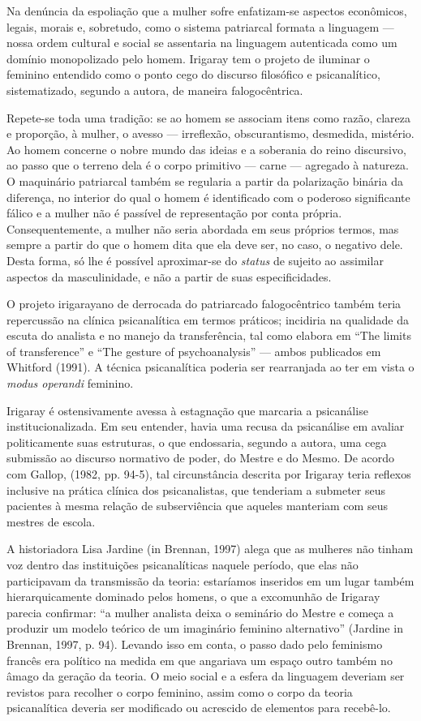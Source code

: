 Na denúncia da espoliação que a mulher sofre enfatizam-se aspectos
econômicos, legais, morais e, sobretudo, como o sistema patriarcal
formata a linguagem --- nossa ordem cultural e social se assentaria na
linguagem autenticada como um domínio monopolizado pelo homem. Irigaray
tem o projeto de iluminar o feminino entendido como o ponto cego do
discurso filosófico e psicanalítico, sistematizado, segundo a autora, de
maneira falogocêntrica.

Repete-se toda uma tradição: se ao homem se associam itens como razão,
clareza e proporção, à mulher, o avesso --- irreflexão, obscurantismo,
desmedida, mistério. Ao homem concerne o nobre mundo das ideias e a
soberania do reino discursivo, ao passo que o terreno dela é o corpo
primitivo --- carne --- agregado à natureza. O maquinário patriarcal
também se regularia a partir da polarização binária da diferença, no
interior do qual o homem é identificado com o poderoso significante
fálico e a mulher não é passível de representação por conta própria.
Consequentemente, a mulher não seria abordada em seus próprios termos,
mas sempre a partir do que o homem dita que ela deve ser, no caso, o
negativo dele. Desta forma, só lhe é possível aproximar-se do
\emph{status} de sujeito ao assimilar aspectos da masculinidade, e não a
partir de suas especificidades.

O projeto irigarayano de derrocada do patriarcado falogocêntrico também
teria repercussão na clínica psicanalítica em termos práticos; incidiria
na qualidade da escuta do analista e no manejo da transferência, tal
como elabora em ``The limits of transference'' e ``The gesture of
psychoanalysis'' --- ambos publicados em Whitford (1991). A técnica
psicanalítica poderia ser rearranjada ao ter em vista o \emph{modus
operandi} feminino.

Irigaray é ostensivamente avessa à estagnação que marcaria a psicanálise
institucionalizada. Em seu entender, havia uma recusa da psicanálise em
avaliar politicamente suas estruturas, o que endossaria, segundo a
autora, uma cega submissão ao discurso normativo de poder, do Mestre e
do Mesmo. De acordo com Gallop, (1982, pp. 94-5), tal circunstância
descrita por Irigaray teria reflexos inclusive na prática clínica dos
psicanalistas, que tenderiam a submeter seus pacientes à mesma relação
de subserviência que aqueles manteriam com seus mestres de escola.

A historiadora Lisa Jardine (in Brennan, 1997) alega que as mulheres não
tinham voz dentro das instituições psicanalíticas naquele período, que
elas não participavam da transmissão da teoria: estaríamos inseridos em
um lugar também hierarquicamente dominado pelos homens, o que a
excomunhão de Irigaray parecia confirmar: ``a mulher analista deixa o
seminário do Mestre e começa a produzir um modelo teórico de um
imaginário feminino alternativo'' (Jardine in Brennan, 1997, p. 94).
Levando isso em conta, o passo dado pelo feminismo francês era político
na medida em que angariava um espaço outro também no âmago da geração da
teoria. O meio social e a esfera da linguagem deveriam ser revistos para
recolher o corpo feminino, assim como o corpo da teoria psicanalítica
deveria ser modificado ou acrescido de elementos para recebê-lo.

